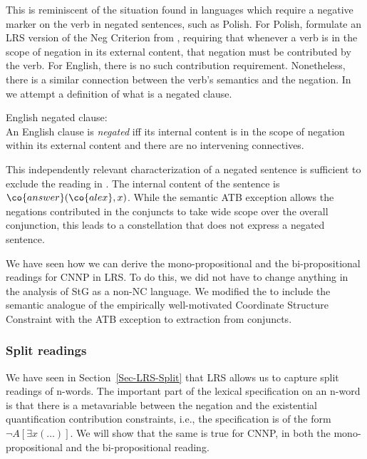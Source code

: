 \documentclass[output=paper]{langsci/langscibook}
\begin{document}
This is reminiscent of the situation found in languages which require a negative marker on the verb in negated sentences, such as Polish. For Polish, \citet{Richter:Sailer:06} formulate an LRS version of the Neg Criterion from \citet{Haegeman&Zanuttini:96}, requiring that whenever a verb is in the scope of negation in its external content, that negation must be contributed by the verb. 
For English, there is no such contribution requirement. Nonetheless, there is a similar connection between the verb's semantics and the negation.
In  we attempt a definition of what is a negated clause.

\ea English negated clause:\label{def-negatedclause}\\
An English clause is \emph{negated} iff its internal content is in the scope of negation within its external content and there are no intervening connectives.
\z 

This independently relevant characterization of a negated sentence is sufficient to exclude the reading in . 
The internal content of the sentence is $\co{answer}(\co{alex},x)$. 
While the semantic ATB exception allows the negations contributed in the conjuncts to take wide scope over the overall conjunction, this leads to a constellation that does not express a negated sentence.

\bigskip%
We have seen how we can derive the mono-propositional and the bi-pro\-po\-si\-tional readings for CNNP in LRS. 
To do this, we did not have to change anything in the analysis of StG as a non-NC language. We modified the \SemATB{} to include the semantic analogue of the empirically well-motivated Coordinate Structure Constraint with the ATB exception to extraction from conjuncts. 

\subsubsection{Split readings}
\label{Sec-AnalysisSplitReadings}

We have seen in Section~\ref{Sec-LRS-Split} that LRS allows us to capture split readings of n-words. The important part of the lexical specification on an n-word is that there is a metavariable between the negation and the existential quantification contribution constraints, i.e., the specification is of the form $\lnot A[\exists x (\ldots)]$. We will show that the same is true for CNNP, in both the mono-propositional and the bi-propositional reading.
\end{document}
